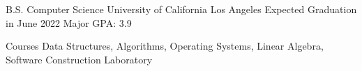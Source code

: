 \documentclass[12pt, letterpaper]{awesome-cv}
\begin{document}
\makecvheader


\begin{cventries}
  \cventry
    {B.S. Computer Science} %
    {University of California Los Angeles} %
    {Expected Graduation in June 2022} %
    {Major GPA: 3.9} %
    {
      \vspace{-0.11in}
      \begin{cvskills}
        \cvskill
          {Courses} %
          {Data Structures, Algorithms, Operating Systems, Linear Algebra, Sof\/tware Construction Laboratory} %
      \end{cvskills}
    }
  \vspace{-0.2in}
\end{cventries}
\end{document}

